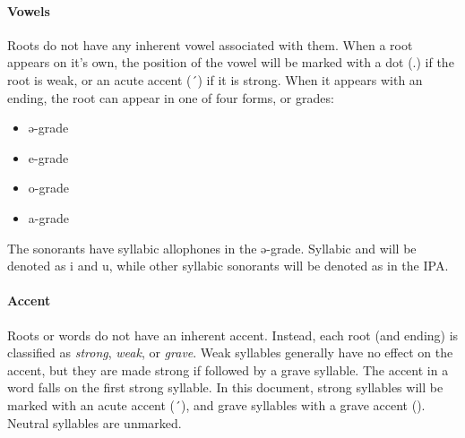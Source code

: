 \paragraph{Vowels}
Roots do not have any inherent vowel associated with them. When a
root appears on it's own, the position of the vowel will be marked with a dot
(.) if the root is weak, or an acute accent (´) if it is strong. When it
appears with an ending, the root can appear in one of four forms, or grades:
\begin{itemize}
    \item {\ll ə}-grade
    \item {\ll e}-grade
    \item {\ll o}-grade
    \item {\ll a}-grade
\end{itemize}
The sonorants have syllabic allophones in the ə-grade. Syllabic  and
 will be denoted as {\ll i} and {\ll u}, while other syllabic
sonorants will be denoted as in the IPA.

\paragraph{Accent}
Roots or words do not have an inherent accent. Instead, each root (and ending)
is classified as {\em strong}, {\em weak}, or {\em grave}. Weak syllables
generally have no effect on the accent, but they are made strong if followed by
a grave syllable. The accent in a word falls on the first strong syllable. In
this document, strong syllables will be marked with an acute accent (´), and
grave syllables with a grave accent (\textgrave). Neutral syllables are
unmarked.


